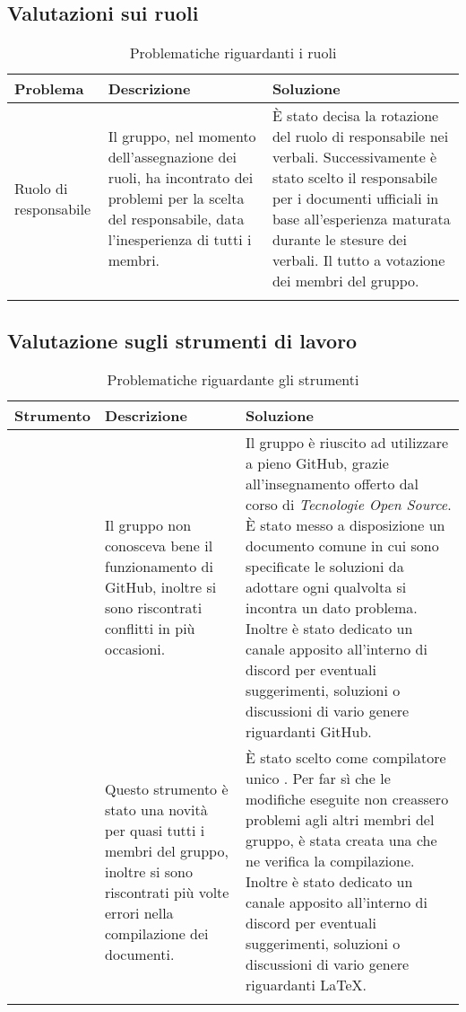 	\subsection{Valutazioni sui ruoli}
	\begin{center}
		\begin{longtable}{|C{2cm}|p{6cm}|p{6cm}|}
			\hline
			\textbf{Problema} & \textbf{Descrizione} & \textbf{Soluzione}  \\ 			
			\hline
			\endhead
			
			\hline
			Ruolo di responsabile & Il gruppo, nel momento dell'assegnazione dei ruoli, ha incontrato dei problemi per la scelta del responsabile, data l'inesperienza di tutti i membri. & È stato decisa la rotazione del ruolo di responsabile nei verbali. Successivamente è stato scelto il responsabile per i documenti ufficiali in base all'esperienza maturata durante le stesure dei verbali. Il tutto a votazione dei membri del gruppo. \\
			\hline
			
			\hiderowcolors
			\caption{Problematiche riguardanti i ruoli}		
		\end{longtable}	
	\end{center}
	\subsection{Valutazione sugli strumenti di lavoro}
	\begin{center}
		\begin{longtable}{|C{2cm}|p{6cm}|p{6cm}|}
			\hline
			\textbf{Strumento} & \textbf{Descrizione} & \textbf{Soluzione}  \\ 			
			\hline
			\endhead
			
			\hline
			 & Il gruppo non conosceva bene il funzionamento di GitHub, inoltre si sono riscontrati conflitti in più occasioni. & Il gruppo è riuscito ad utilizzare a pieno GitHub, grazie all'insegnamento offerto dal corso di \textit{Tecnologie Open Source}. È stato messo a disposizione un documento comune in cui sono specificate le soluzioni da adottare ogni qualvolta si incontra un dato problema. Inoltre è stato dedicato un canale apposito all'interno di discord per eventuali suggerimenti, soluzioni o discussioni di vario genere riguardanti GitHub.\\
			\hline	
			\glock{\LaTeX} & Questo strumento è stato una novità per quasi tutti i membri del gruppo, inoltre si sono riscontrati più volte errori nella compilazione dei documenti. & È stato scelto come compilatore unico . Per far sì che le modifiche eseguite non creassero problemi agli altri membri del gruppo, è stata creata una  che ne verifica la compilazione. Inoltre è stato dedicato un canale apposito all'interno di discord per eventuali suggerimenti, soluzioni o discussioni di vario genere riguardanti \LaTeX. \\
			\hline	
			
			\hiderowcolors
			\caption{Problematiche riguardante gli strumenti}		
		\end{longtable}	
	\end{center}
